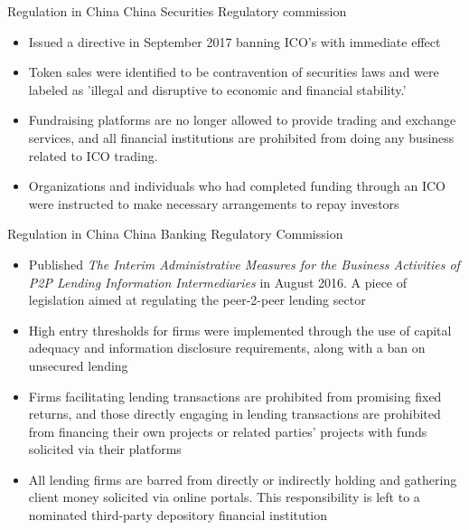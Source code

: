 \documentclass[11pt]{beamer}
\begin{document}
\begin{frame}{Regulation in China}
	China Securities Regulatory commission
	\begin{itemize}
		\item Issued a directive in September 2017 banning ICO's with immediate effect
		\item Token sales were identified to be contravention of securities laws and were labeled as 'illegal and disruptive to economic and financial stability.'
		\item Fundraising platforms are no longer allowed to provide trading and exchange services, and all financial institutions are prohibited from doing any business related to ICO trading.
		\item Organizations and individuals who had completed funding through an ICO were instructed to make necessary arrangements to repay investors
	\end{itemize}
\end{frame}


\begin{frame}{Regulation in China}
	China Banking Regulatory Commission
	\begin{itemize}
		\item Published \textit{The Interim Administrative Measures for the Business Activities of P2P Lending Information Intermediaries} in August 2016. A piece of legislation aimed at regulating the peer-2-peer lending sector
		\item High entry thresholds for firms were implemented through the use of capital adequacy and information disclosure requirements, along with a ban on unsecured lending
		\item Firms facilitating lending transactions are prohibited from promising fixed returns, and those directly engaging in lending transactions are prohibited from financing their own projects or related parties' projects with funds solicited via their platforms
		\item All lending firms are barred from directly or indirectly holding and gathering client money solicited via online portals. This responsibility is left to a nominated third-party depository financial institution
	\end{itemize}
\end{frame}

\end{document}
